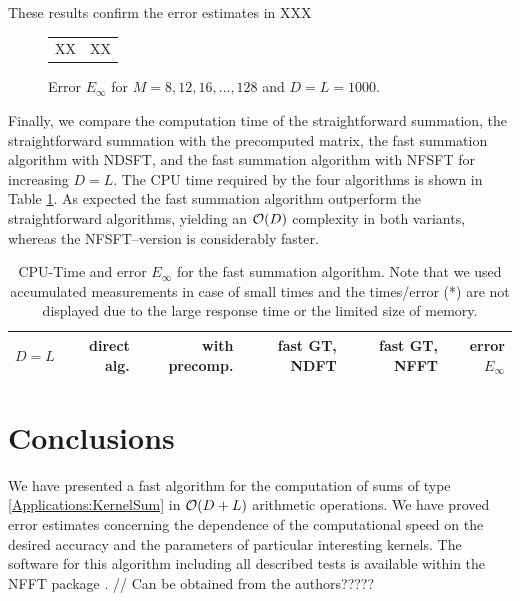 \documentclass[11pt,a4paper,twoside,bibtotoc]{scrartcl}
\theoremstyle{plain}
\theoremstyle{definition}
\theoremstyle{remark}
\numberwithin{equation}{section}
\numberwithin{table}{section}
\numberwithin{figure}{section}
\begin{document}
These results confirm the error estimates in XXX

\begin{figure}[ht]
  \centering
  \begin{tabular}[h]{cc}
    XX & XX
  \end{tabular}
  \caption[fig:Time]{Error $E_{\infty}$ for $M=8,12,16,\hdots,128$ and $D=L=1000$.
    \label{fig:error}}
\end{figure}

Finally, we compare the computation time of the straightforward summation, the
straightforward summation with the precomputed matrix, the fast summation
algorithm with NDSFT, and the fast summation algorithm with NFSFT for
increasing $D=L$. 
The CPU time required by the four algorithms is shown in Table
\ref{tab:TimeSpace}. 
As expected the fast summation algorithm outperform the straightforward
algorithms, yielding an ${\cal O}(D)$ complexity in both variants, whereas the
NFSFT--version is considerably faster.



\begin{table}[ht!]
  \begin{center}
    \begin{tabular}{r|r|r|r|r|r}
      $D=L$    & direct alg.   & with precomp. & fast GT, NDFT & fast GT, NFFT & error $E_\infty$ \\ \hline
    \end{tabular}
  \end{center}
  \caption{CPU-Time and error $E_{\infty}$ for the fast summation algorithm.
    Note that we used accumulated measurements in case of small times and the
    times/error (*) are not displayed due to the large response time or the 
    limited size of memory.}
  \label{tab:TimeSpace}
\end{table}


\section{Conclusions}

We have presented a fast algorithm for the computation of sums of type
\eqref{Applications:KernelSum} in ${\cal O} (D +L)$ arithmetic operations.
We have proved error estimates concerning the dependence of the computational
speed on the desired accuracy and the parameters of particular interesting
kernels.
The software for this algorithm including all described tests is available
within the NFFT package \cite[{\tt ./example/fastsumS2}]{kupo02C}. // Can be
obtained from the authors?????


%
%
%

\end{document}
